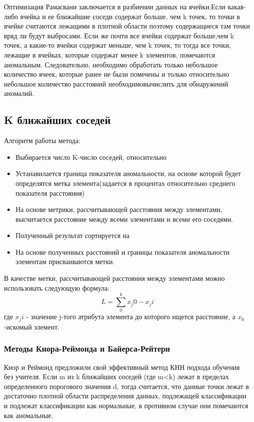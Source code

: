  Оптимизация Рамасвани заключается в разбиении данных на ячейки.Если какая-либо ячейка и ее ближайшие соседи содержат больше, чем k
 точек, то точки в ячейке считаются лежащими в плотной области
 поэтому содержащиеся там точки вряд ли будут выбросами. Если же почти все ячейки содержат больше,чем k точек, а какие-то ячейки содержат меньше, чем k точек, то тогда все точки, лежащие в ячейках, которые содержат  менее k элементов, помечаются  аномальным. Следовательно,
 необходимо обработать только небольшое количество ячеек, которые ранее не были помечены и только относительно небольшое количество расстояний необходимовычислить для обнаружений аномалий. 
 \subsection{K ближайших соседей}
 Алгоритм работы метода:
 \begin{itemize}
 	\item Выбирается число K-число соседей, относительно
 	\item Устанавилается граница показателя аномальности, на основе которой будет определятся метка элемента(задается в процентах относительно среднего показателя расстояния)
 	\item На основе метрики, рассчитывающей расстояния между элементами, высчитается расстояние между всеми элементами и всеми его соседями.
 	\item Полученный результат сортируется на 
 	\item На основе полученных расстояний и границы показателя аномальности элементам присваиваются метки.
 \end{itemize}
 В качестве метки, рассчитывающей расстояния между элементами можно использовать следующую формула:
 \begin{equation}
 L=\sum_{0}^{k}x_j0 - x_ji
 \end{equation}
 где $x_ji$ - значение j-того атрибута элемента до которого ищется расстояние, а $x_0$-искомый элемент.
 
 \subsubsection{Методы Кнора-Реймонда и Байерса-Рейтери}
 Кнор и Реймонд предложили свой эффективный метод  КНН подхода обучения без учителя\cite{Book09}. Если m из k ближайших соседей (где m<k) лежат
 в пределах определенного порогового значения d, тогда  считается, что  данные точки лежат в достаточно плотной области распределения данных, подлежащей классификации и подлежат классификации как нормальные, в противном случае они помечаются как аномальные.
 
